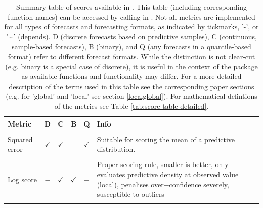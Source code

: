 \documentclass[
]{jss}
\begin{document}
\begin{CodeChunk}
\begingroup\fontsize{7.5}{9.5}\selectfont

\begin{longtable}[t]{>{\raggedright\arraybackslash}p{2.9cm}cccc>{\raggedright\arraybackslash}p{9.3cm}}
\caption{\label{tab:metrics-summary}Summary table of scores available in . This table (including corresponding function names) can be accessed by calling  in . Not all metrics are implemented for all types of forecasts and forecasting formats, as indicated by tickmarks, '-', or '$\sim$' (depends). D (discrete forecasts based on predictive samples), C (continuous, sample-based forecasts), B (binary), and Q (any forecasts in a quantile-based format) refer to different forecast formats. While the distinction is not clear-cut (e.g. binary is a special case of discrete), it is useful in the context of the package as available functions and functionality may differ. For a more detailed description of the terms used in this table see the corresponding paper sections (e.g. for 'global' and 'local' see section \ref{localglobal}). For mathematical defintions of the metrics see Table \ref{tab:score-table-detailed}.}\\
\toprule
Metric & D & C & B & Q & Info\\
\midrule
\cellcolor{gray!6}{Absolute error} & \cellcolor{gray!6}{$\checkmark$} & \cellcolor{gray!6}{$\checkmark$} & \cellcolor{gray!6}{$-$} & \cellcolor{gray!6}{$\checkmark$} & \cellcolor{gray!6}{Suitable for scoring the median of a predictive distribution}\\
\addlinespace
Squared error & $\checkmark$ & $\checkmark$ & $-$ & $\checkmark$ & Suitable for scoring the mean of a predictive distribution.\\
\addlinespace
\cellcolor{gray!6}{(Continuous) ranked probability score (CRPS)} & \cellcolor{gray!6}{$\checkmark$} & \cellcolor{gray!6}{$\checkmark$} & \cellcolor{gray!6}{$-$} & \cellcolor{gray!6}{$-$} & \cellcolor{gray!6}{Proper scoring rule (smaller is better), takes entire predictive distribution into account (global), penalises over$-$ and under$-$confidence similarly, stable handling of outliers}\\
\addlinespace
Log score & $-$ & $\checkmark$ & $\checkmark$ & $-$ & Proper scoring rule, smaller is better, only evaluates predictive density at observed value (local), penalises over$-$confidence severely, susceptible to outliers\\
\addlinespace

\end{longtable}
\end{CodeChunk}
\end{document}
